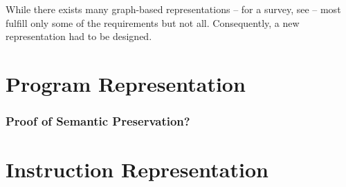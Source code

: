 While there exists many graph-based representations -- for a survey, see
\cite{StanierWatson:2013} -- most fulfill only some of the requirements but not
all.
%
Consequently, a new representation had to be designed.



\section{Program Representation}




\subsubsection{Proof of Semantic Preservation?}




\section{Instruction Representation}

